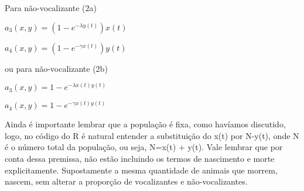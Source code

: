 Para não-vocalizante (2a)

\begin{center}
\vspace{3 mm}
$a_3(x,y)=(1-e^{-\lambda y(t)})x(t)$

\vspace{3 mm}
$a_4(x,y)=(1-e^{-\gamma x(t)})y(t)$
\end{center}

ou para não-vocalizante (2b)

\begin{center}
\vspace{3 mm}
$a_3(x,y)=1-e^{-\lambda x(t)y(t)}$

\vspace{3 mm}
$a_4(x,y)=1-e^{-\gamma x(t)y(t)}$
\end{center}

Ainda é importante lembrar que a população é fixa, como havíamos discutido, logo, no código do R é natural entender a substituição do x(t) por N-y(t), onde N é o número total da população, ou seja, N=x(t) + y(t). Vale lembrar que por conta dessa premissa, não estão incluindo os termos de nascimento e morte explicitamente. Supostamente a mesma quantidade de animais que morrem, nascem, sem alterar a proporção de vocalizantes e não-vocalizantes.